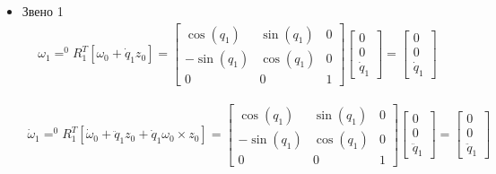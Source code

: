 \documentclass[a4paper,14pt]{extreport}
\begin{document}
\begin{itemize}
\item Звено 1
\begin{align*}
\omega_1 = ^0R_1^T [\omega_0 + \dot q_1 z_0] =
\left[
\begin{matrix}\cos{\left (q_{1} \right )} & \sin{\left (q_{1} \right )} & 0\\- \sin{\left (q_{1} \right )} & \cos{\left (q_{1} \right )} & 0\\0 & 0 & 1
\end{matrix}
\right]
\left[\begin{matrix}0\\0\\\dot{q}_1\end{matrix}\right] = 
\left[\begin{matrix}0\\0\\\dot{q}_1\end{matrix}\right]
\end{align*}

\begin{align*}
\dot \omega_1 = ^0R_1^T [\dot \omega_0 + \ddot q_1 z_0 + \dot q_1 \omega_0 \times z_0] = 
\left[
\begin{matrix}\cos{\left (q_{1} \right )} & \sin{\left (q_{1} \right )} & 0\\- \sin{\left (q_{1} \right )} & \cos{\left (q_{1} \right )} & 0\\0 & 0 & 1
\end{matrix}
\right]
\left[\begin{matrix}0\\0\\\ddot{q}_1\end{matrix}\right]
=
\left[\begin{matrix}0\\0\\\ddot{q}_1\end{matrix}\right]
\end{align*}


\end{itemize}
\end{document}
